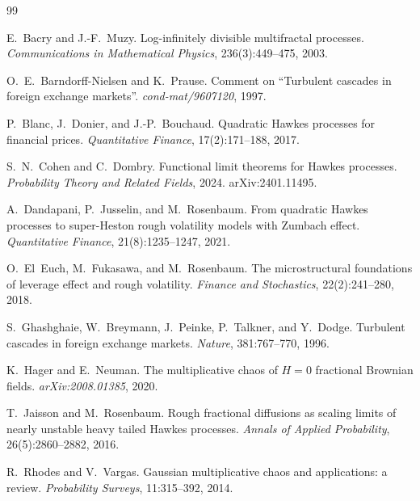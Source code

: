 \documentclass[11pt]{article}
\begin{document}

\begin{thebibliography}{99}

E.~Bacry and J.-F.~Muzy.
\newblock Log-infinitely divisible multifractal processes.
\newblock \emph{Communications in Mathematical Physics}, 236(3):449--475, 2003.

O.~E.~Barndorff-Nielsen and K.~Prause.
\newblock Comment on ``Turbulent cascades in foreign exchange markets''.
\newblock \emph{cond-mat/9607120}, 1997.

P.~Blanc, J.~Donier, and J.-P.~Bouchaud.
\newblock Quadratic Hawkes processes for financial prices.
\newblock \emph{Quantitative Finance}, 17(2):171--188, 2017.

S.~N.~Cohen and C.~Dombry.
\newblock Functional limit theorems for Hawkes processes.
\newblock \emph{Probability Theory and Related Fields}, 2024. arXiv:2401.11495.

A.~Dandapani, P.~Jusselin, and M.~Rosenbaum.
\newblock From quadratic Hawkes processes to super-Heston rough volatility models with Zumbach effect.
\newblock \emph{Quantitative Finance}, 21(8):1235--1247, 2021.

O.~El~Euch, M.~Fukasawa, and M.~Rosenbaum.
\newblock The microstructural foundations of leverage effect and rough volatility.
\newblock \emph{Finance and Stochastics}, 22(2):241--280, 2018.

S.~Ghashghaie, W.~Breymann, J.~Peinke, P.~Talkner, and Y.~Dodge.
\newblock Turbulent cascades in foreign exchange markets.
\newblock \emph{Nature}, 381:767--770, 1996.

K.~Hager and E.~Neuman.
\newblock The multiplicative chaos of $H=0$ fractional Brownian fields.
\newblock \emph{arXiv:2008.01385}, 2020.

T.~Jaisson and M.~Rosenbaum.
\newblock Rough fractional diffusions as scaling limits of nearly unstable heavy tailed Hawkes processes.
\newblock \emph{Annals of Applied Probability}, 26(5):2860--2882, 2016.

R.~Rhodes and V.~Vargas.
\newblock Gaussian multiplicative chaos and applications: a review.
\newblock \emph{Probability Surveys}, 11:315--392, 2014.


\end{thebibliography}
\end{document}
